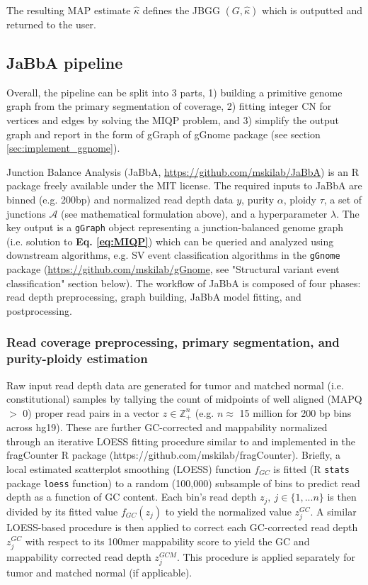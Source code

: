 \documentclass[phd,tocprelim]{cornell}
\newcommand{\ttt}[1]{\texttt{#1}}
\begin{document}
The resulting MAP estimate $\hat{\kappa}$ defines the JBGG $(G,\hat{\kappa})$ which is outputted and returned to the user.


\subsection{JaBbA pipeline}
Overall, the pipeline can be split into 3 parts, 1) building a primitive genome graph from the primary segmentation of coverage, 2) fitting integer CN for vertices and edges by solving the MIQP problem, and 3) simplify the output graph and report in the form of gGraph of gGnome package (see section \ref{sec:implement_ggnome}).

Junction Balance Analysis (JaBbA, \url{https://github.com/mskilab/JaBbA}) is an R package freely available under the MIT license. The required inputs to JaBbA are binned (e.g. 200bp) and normalized read depth data $y$, purity $\alpha$, ploidy $\tau$, a set of junctions $\mathcal{A}$ (see mathematical formulation above), and a hyperparameter $\lambda$. The key output is a \texttt{gGraph} object representing a junction-balanced genome graph (i.e. solution to \textbf{Eq. \ref{eq:MIQP}}) which can be queried and analyzed using downstream algorithms, e.g. SV event classification algorithms in the \texttt{gGnome} package (\url{https://github.com/mskilab/gGnome}, see "Structural variant event classification" section below). The workflow of JaBbA is composed of four phases: read depth preprocessing, graph building, JaBbA model fitting, and postprocessing.

\subsubsection*{Read coverage preprocessing, primary segmentation, and purity-ploidy estimation}
Raw input read depth data are generated for tumor and matched normal (i.e. constitutional) samples by tallying the count of midpoints of well aligned (MAPQ $>$ 0) proper read pairs in a vector $z \in \mathbb{Z}^n_+$ (e.g. $n \approx$ 15 million for 200 bp bins across hg19).  These are further GC-corrected and mappability normalized through an iterative LOESS fitting procedure similar to \cite{Ha:2012kr} and implemented in the fragCounter R package (https://github.com/mskilab/fragCounter). Briefly, a local estimated scatterplot smoothing (LOESS) function $f_{GC}$ is fitted (R \ttt{stats} package \ttt{loess} function) to a random (100,000) subsample of bins to predict read depth as a function of GC content. Each bin's read depth $z_j,~j \in \{1, ... n\}$ is then divided by its fitted value $f_{GC}(z_j)$ to yield the normalized value $z^{GC}_j$.  A similar LOESS-based procedure is then applied to correct each GC-corrected read depth $z^{GC}_j$ with respect to its 100mer mappability score to yield the GC and mappability corrected read depth $z^{GCM}_j$.  This procedure is applied separately for tumor and matched normal (if applicable).
\end{document}
